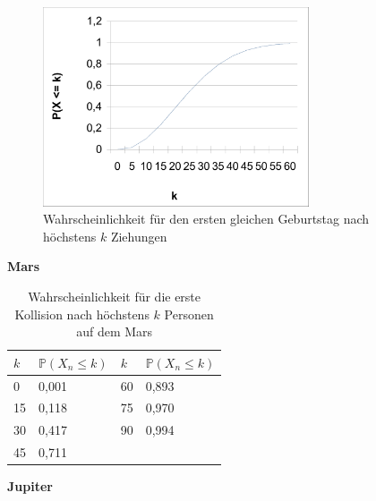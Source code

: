 \documentclass[../main.tex]{subfiles}
\begin{document}
    \begin{figure}[h]
        \begin{center}
            \includegraphics[width=0.7\textwidth]{../graphics/perde.png}
        \end{center}
        \caption{\label{num.fpe} Wahrscheinlichkeit für den ersten gleichen Geburtstag nach höchstens $k$ Ziehungen}
    \end{figure}


    \textbf{Mars}

    \begin{table}[h]
        \centering
        \begin{tabular}{|l|l|l|l|}
            \hline
            $k$ & $\mathbb{P}(X_{n} \leq k)$ & $k$ & $\mathbb{P}(X_{n} \leq k)$ \\ \hline
            0   & 0,001                      & 60  & 0,893                      \\
            15  & 0,118                      & 75  & 0,970                      \\
            30  & 0,417                      & 90  & 0,994                      \\
            45  & 0,711                      &     &                            \\ \hline
        \end{tabular}
        \caption{\label{num.tpm} Wahrscheinlichkeit für die erste Kollision nach höchstens $k$ Personen auf dem Mars}
    \end{table}

    \textbf{Jupiter}
\end{document}
